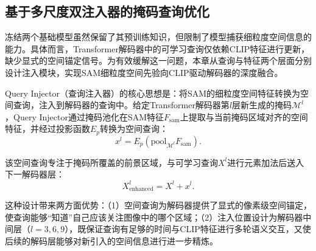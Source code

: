 


\subsection{基于多尺度双注入器的掩码查询优化}

\label{sec:chap4_dual_injector}

冻结两个基础模型虽然保留了其预训练知识，但限制了模型捕获细粒度空间信息的能力。具体而言，Transformer解码器中的可学习查询仅依赖CLIP特征进行更新，缺少显式的空间锚定信号。为有效缓解这一问题，本章从查询与特征两个层面分别设计注入模块，实现SAM细粒度空间先验向CLIP驱动解码器的深度融合。

Query Injector（查询注入器）的核心思想是：将SAM的细粒度空间特征转换为空间查询，注入到解码器的查询中。给定Transformer解码器第$l$层新生成的掩码$\mathcal{M}^l$，Query Injector通过掩码池化在SAM特征$F_{\text{sam}}$上提取与当前掩码区域对齐的空间特征，并经过投影函数$E_p$转换为空间查询：
\begin{equation}
x^l = E_p(\mathrm{pool}_{\mathcal{M}^l} F_{\text{sam}}).
\label{eq:query_injector}
\end{equation}

该空间查询专注于掩码所覆盖的前景区域，与可学习查询$X^l$进行元素加法后送入下一解码器层：
\begin{equation}
X^l_{\text{enhanced}} = X^l + x^l.
\end{equation}

这种设计带来两方面优势：（1）空间查询为解码器提供了显式的像素级空间锚定，使查询能够“知道”自己应该关注图像中的哪个区域；（2）注入位置设计为解码器中间层（$l=3,6,9$），既保证查询有足够的时间与CLIP特征进行多轮语义交互，又使后续的解码层能够对新引入的空间信息进行进一步精炼。

